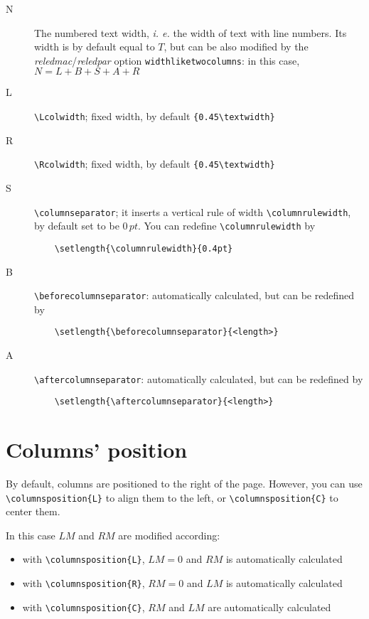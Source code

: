 \documentclass[11pt,a4paper]{article}
\newcommand{\package}[1]{\emph{#1}}
\begin{document}
\begin{description}	
	\item[N] The numbered text width, \emph{i. e.} the width of text with line numbers. Its width is by default equal to $T$, but can be also modified by the \package{reledmac}/\package{reledpar} option \verb!widthliketwocolumns!: in this case, $N=L+B+S+A+R$
	
	\item[L] \verb!\Lcolwidth!; fixed width, by default \verb!{0.45\textwidth}!
	
	\item[R] \verb!\Rcolwidth!; fixed width, by default \verb!{0.45\textwidth}!
	
	\item[S] \verb!\columnseparator!; it inserts a vertical rule of width \verb!\columnrulewidth!, by default set to be $0\,pt$. You can redefine \verb!\columnrulewidth! by
	
\begin{verbatim}
	\setlength{\columnrulewidth}{0.4pt}
\end{verbatim}
	
	\item[B] \verb!\beforecolumnseparator!: automatically calculated, but can be redefined by
	
\begin{verbatim}
	\setlength{\beforecolumnseparator}{<length>}
\end{verbatim}
	
	\item[A] \verb!\aftercolumnseparator!: automatically calculated, but can be redefined by

\begin{verbatim}
	\setlength{\aftercolumnseparator}{<length>}
\end{verbatim}

\end{description}

\section{Columns' position}
By default, columns are positioned to the right of the page. However, you can use
\verb!\columnsposition{L}! to align them to the left, or \verb!\columnsposition{C}! to center
them.

In this case $LM$ and $RM$ are modified according:

\begin{itemize}
	\item with \verb!\columnsposition{L}!, $LM=0$ and $RM$ is automatically calculated
	\item with \verb!\columnsposition{R}!, $RM=0$ and $LM$ is automatically calculated
	\item with \verb!\columnsposition{C}!, $RM$ and $LM$ are automatically calculated
\end{itemize}
\end{document}
